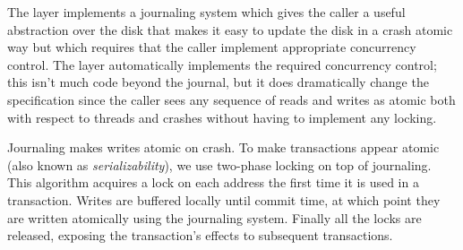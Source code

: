 The  layer implements a journaling system which gives the caller a
useful abstraction over the disk that makes it easy to update the disk in a
crash atomic way but which requires that the caller implement appropriate
concurrency control. The  layer automatically implements the required
concurrency control; this isn't much code beyond the journal, but it does
dramatically change the specification since the caller sees any sequence of
reads and writes as atomic both with respect to threads and crashes without
having to implement any locking.

Journaling makes writes atomic on crash. To make transactions appear atomic
(also known as \emph{serializability}), we use two-phase locking on top of
journaling. This algorithm acquires a lock on each address the first time it is
used in a transaction. Writes are buffered locally until commit time, at which
point they are written atomically using the journaling system. Finally all the
locks are released, exposing the transaction's effects to subsequent
transactions.


